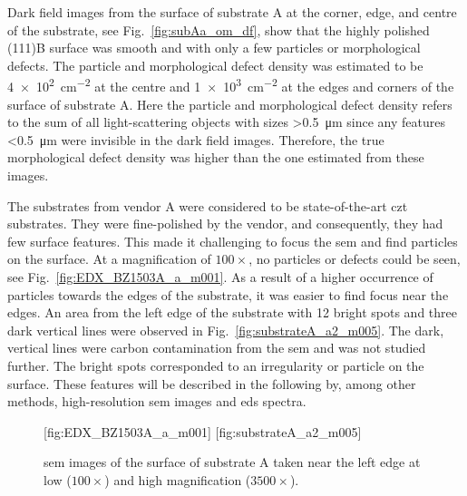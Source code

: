 Dark field images from the surface of substrate A at the corner, edge, and centre of the substrate, see Fig.~\ref{fig:subAa_om_df}, show that the highly polished (111)B surface was smooth and with only a few particles or morphological defects. The particle and morphological defect density was estimated to be \SI{4e2}{\centi\metre^{-2}} at the centre and \SI{1e3}{\centi\metre^{-2}} at the edges and corners of the surface of substrate A. Here the particle and morphological defect density refers to the sum of all light-scattering objects with sizes \SI{>0.5}{\micro\metre} since any features \SI{<0.5}{\micro\metre} were invisible in the dark field images. Therefore, the true morphological defect density was higher than the one estimated from these images.

The substrates from vendor A were considered to be state-of-the-art \ac{czt} substrates. They were fine-polished by the vendor, and consequently, they had few surface features. This made it challenging to focus the \ac{sem} and find particles on the surface. At a magnification of $100\times$, no particles or defects could be seen, see Fig.~\ref{fig:EDX_BZ1503A_a_m001}. As a result of a higher occurrence of particles towards the edges of the substrate, it was easier to find focus near the edges. An area from the left edge of the substrate with 12 bright spots and three dark vertical lines were observed in Fig.~\ref{fig:substrateA_a2_m005}. The dark, vertical lines were carbon contamination from the \ac{sem} and was not studied further. The bright spots corresponded to an irregularity or particle on the surface. These features will be described in the following by, among other methods, high-resolution \ac{sem} images and \ac{eds} spectra.

\begin{figure}[htbp]
    \centering
    [fig:EDX_BZ1503A_a_m001]
    \hfill
    [fig:substrateA_a2_m005]
    \caption[\Ac{sem} images of substrate A.]{\Ac{sem} images of the surface of substrate A taken near the left edge at  low ($100\times$) and  high magnification ($3500\times$).}
    \label{fig:subA_overview}
\end{figure}

